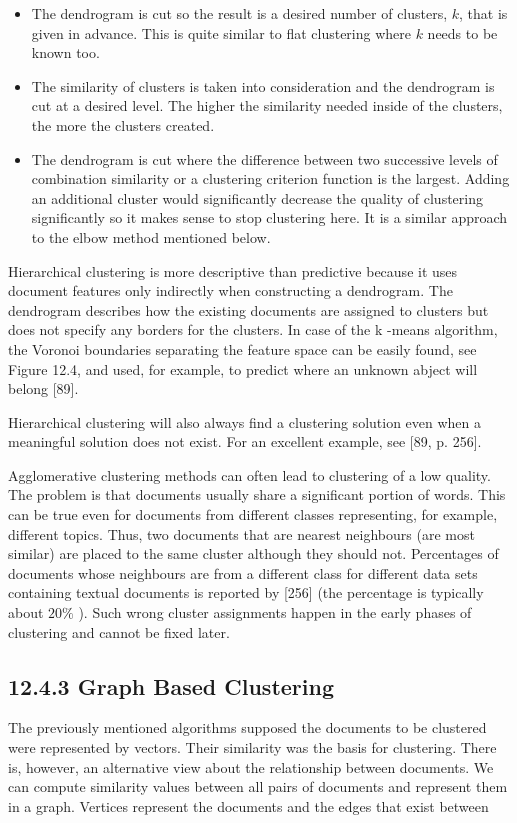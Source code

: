 \documentclass[10pt]{book}
\begin{document}
\begin{itemize}
  \item The dendrogram is cut so the result is a desired number of clusters, $k$, that is given in advance. This is quite similar to flat clustering where $k$ needs to be known too.
  \item The similarity of clusters is taken into consideration and the dendrogram is cut at a desired level. The higher the similarity needed inside of the clusters, the more the clusters created.
  \item The dendrogram is cut where the difference between two successive levels of combination similarity or a clustering criterion function is the largest. Adding an additional cluster would significantly decrease the quality of clustering significantly so it makes sense to stop clustering here. It is a similar approach to the elbow method mentioned below.
\end{itemize}

Hierarchical clustering is more descriptive than predictive because it uses document features only indirectly when constructing a dendrogram. The dendrogram describes how the existing documents are assigned to clusters but does not specify any borders for the clusters. In case of the k -means algorithm, the Voronoi boundaries separating the feature space can be easily found, see Figure 12.4, and used, for example, to predict where an unknown abject will belong [89].

Hierarchical clustering will also always find a clustering solution even when a meaningful solution does not exist. For an excellent example, see [89, p. 256].

Agglomerative clustering methods can often lead to clustering of a low quality. The problem is that documents usually share a significant portion of words. This can be true even for documents from different classes representing, for example, different topics. Thus, two documents that are nearest neighbours (are most similar) are placed to the same cluster although they should not. Percentages of documents whose neighbours are from a different class for different data sets containing textual documents is reported by [256] (the percentage is typically about $20 \%$ ). Such wrong cluster assignments happen in the early phases of clustering and cannot be fixed later.

\subsection*{12.4.3 Graph Based Clustering}
The previously mentioned algorithms supposed the documents to be clustered were represented by vectors. Their similarity was the basis for clustering. There is, however, an alternative view about the relationship between documents. We can compute similarity values between all pairs of documents and represent them in a graph. Vertices represent the documents and the edges that exist between
\end{document}
